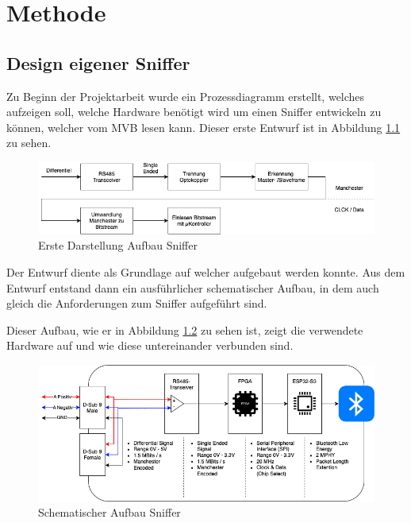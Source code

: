 \chapter{Methode} %
\label{chapter3:Methode} %

\section{Design eigener Sniffer}
\label{Design Sniffer}

Zu Beginn der Projektarbeit wurde ein Prozessdiagramm erstellt, welches aufzeigen soll, welche Hardware
benötigt wird um einen Sniffer entwickeln zu können, welcher vom MVB lesen kann.
Dieser erste Entwurf ist in Abbildung \ref{fig:AufbauSnifferDraft} zu sehen.

\begin{figure}[H]
    \centering
    \includegraphics[width=1\linewidth]{Figures/Chap3/Design Eigener Sniffer/Sniffer_Aufbau_Draft.png}
    \caption{Erste Darstellung Aufbau Sniffer}
    \label{fig:AufbauSnifferDraft}
\end{figure}

Der Entwurf diente als Grundlage auf welcher aufgebaut werden konnte. Aus dem Entwurf entstand dann
ein ausführlicher schematischer Aufbau, in dem auch gleich die Anforderungen zum Sniffer aufgeführt
sind. 

Dieser Aufbau, wie er in Abbildung \ref{fig:AufbauSniffer} zu sehen ist, zeigt die verwendete Hardware
auf und wie diese untereinander verbunden sind.

\begin{figure}[H]
    \centering
    \includegraphics[width=0.9\linewidth]{Figures/Chap3/Design Eigener Sniffer/Aufbau_Sniffer.png}
    \caption{Schematischer Aufbau Sniffer}
    \label{fig:AufbauSniffer}
\end{figure}


